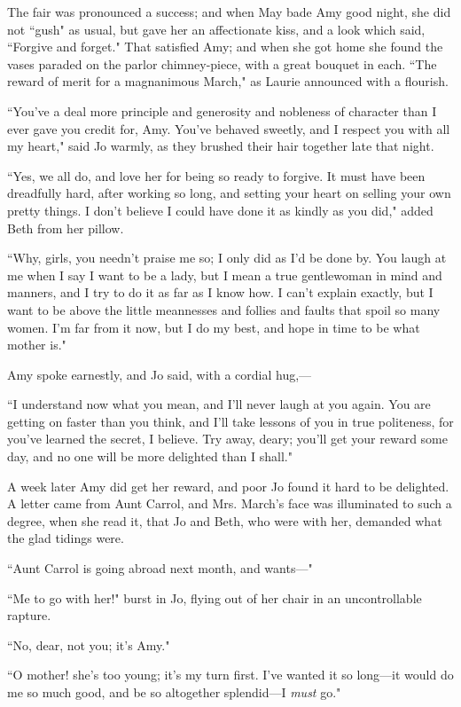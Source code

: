 The fair was pronounced a success; and when May bade Amy good night, she
did not ``gush" as usual, but gave her an affectionate kiss, and a look
which said, ``Forgive and forget." That satisfied Amy; and when she got
home she found the vases paraded on the parlor chimney-piece, with a
great bouquet in each. ``The reward of merit for a magnanimous March," as
Laurie announced with a flourish.

``You've a deal more principle and generosity and
nobleness of character than I ever gave you credit for, Amy.
You've behaved sweetly, and I respect you with all my
heart," said Jo warmly, as they brushed their hair together late that
night.

``Yes, we all do, and love her for being so ready to forgive. It must
have been dreadfully hard, after working so long, and setting your heart
on selling your own pretty things. I don't believe I
could have done it as kindly as you did," added Beth from her pillow.

``Why, girls, you needn't praise me so; I only did as
I'd be done by. You laugh at me when I say I want to be
a lady, but I mean a true gentlewoman in mind and manners, and I try to
do it as far as I know how. I can't explain exactly, but
I want to be above the little meannesses and follies and faults that
spoil so many women. I'm far from it now, but I do my
best, and hope in time to be what mother is."

Amy spoke earnestly, and Jo said, with a cordial hug,---

``I understand now what you mean, and I'll never laugh at
you again. You are getting on faster than you think, and
I'll take lessons of you in true politeness, for
you've learned the secret, I believe. Try away, deary;
you'll get your reward some day, and no one will be more
delighted than I shall."

A week later Amy did get her reward, and poor Jo found it hard to be
delighted. A letter came from Aunt Carrol, and Mrs.
March's face was illuminated to such a degree, when she
read it, that Jo and Beth, who were with her, demanded what the glad
tidings were.

``Aunt Carrol is going abroad next month, and wants---"

``Me to go with her!" burst in Jo, flying out of her chair in an
uncontrollable rapture.

``No, dear, not you; it's Amy."

``O mother! she's too young; it's my turn
first. I've wanted it so long---it would do me so much
good, and be so altogether splendid---I \emph{must} go."

